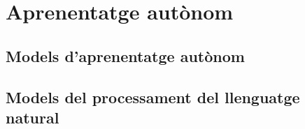 \section{Aprenentatge autònom}

\subsection{Models d'aprenentatge autònom}

\subsection{Models del processament del llenguatge natural}



